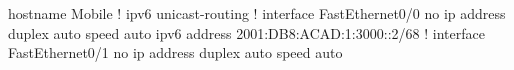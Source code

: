hostname Mobile
!
ipv6 unicast-routing
!
interface FastEthernet0/0
 no ip address
 duplex auto
 speed auto
 ipv6 address 2001:DB8:ACAD:1:3000::2/68
!
interface FastEthernet0/1
 no ip address
 duplex auto
 speed auto

